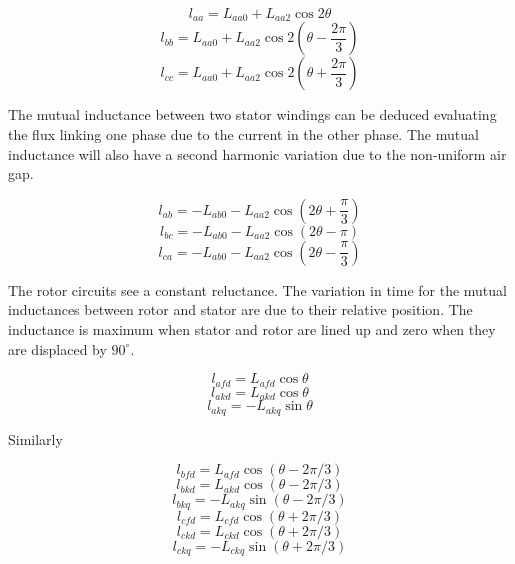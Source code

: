\begin{equation} \label{eq:SelfInductanceA}
	l_{aa} = L_{aa0} + L_{aa2} \cos 2 \theta
\end{equation}
\begin{equation} \label{eq:SelfInductanceB}
	l_{bb} = L_{aa0} + L_{aa2} \cos 2 (\theta - \frac{2 \pi}{3})
\end{equation}
\begin{equation} \label{eq:SelfInductanceC}
	l_{cc} = L_{aa0} + L_{aa2} \cos 2 (\theta + \frac{2 \pi}{3})
\end{equation}

The mutual inductance between two stator windings can be deduced evaluating the flux linking one phase due to the current in the other phase. The mutual inductance will also have a second harmonic variation due to the non-uniform air gap.

\begin{equation} \label{eq:MutualInductanceAB}
	l_{ab} = -L_{ab0} - L_{aa2} \cos (2 \theta + \frac{\pi}{3})
\end{equation}
\begin{equation} \label{eq:MutualInductanceBC}
	l_{bc} = -L_{ab0} - L_{aa2} \cos (2 \theta - \pi)
\end{equation}
\begin{equation} \label{eq:MutualInductanceCA}
	l_{ca} = - L_{ab0} - L_{aa2} \cos (2 \theta - \frac{\pi}{3})
\end{equation}

The rotor circuits see a constant reluctance. The variation in time for the mutual inductances between rotor and stator are due to their relative position. The inductance is maximum when stator and rotor are lined up and zero when they are displaced by $90^{\circ}$.

\begin{equation}
	l_{afd} = L_{afd} \cos \theta
\end{equation}
\begin{equation}
	l_{akd} = L_{akd} \cos \theta
\end{equation}
\begin{equation}
	l_{akq} = -L_{akq} \sin \theta
\end{equation}

Similarly  

\begin{equation}
	l_{bfd} = L_{afd} \cos (\theta - 2 \pi / 3)
\end{equation}
\begin{equation}
	l_{bkd} = L_{akd} \cos (\theta - 2 \pi / 3)
\end{equation}
\begin{equation}
	l_{bkq} = -L_{akq} \sin (\theta - 2 \pi / 3)
\end{equation}
\begin{equation}
	l_{cfd} = L_{cfd} \cos (\theta + 2 \pi / 3)
\end{equation}
\begin{equation}
	l_{ckd} = L_{ckd} \cos (\theta + 2 \pi / 3)
\end{equation}
\begin{equation}
	l_{ckq} = -L_{ckq} \sin (\theta + 2 \pi / 3)
\end{equation}

